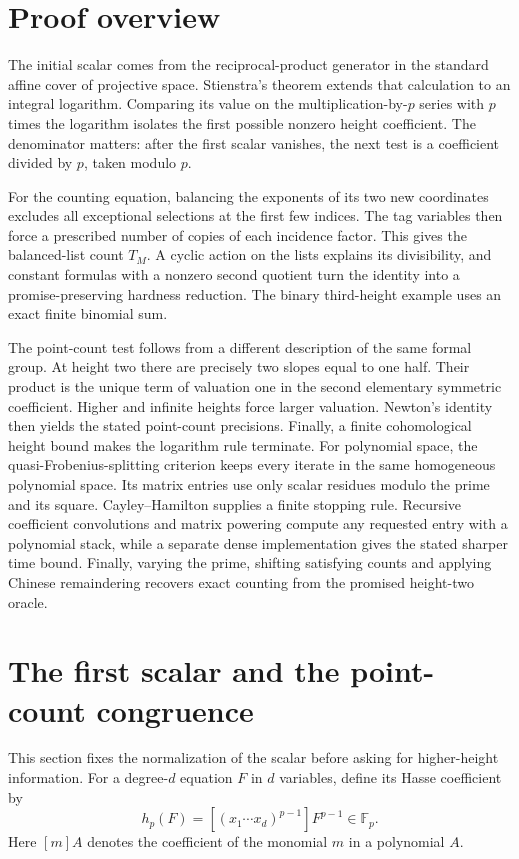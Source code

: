 \documentclass[11pt]{article}
\theoremstyle{definition}
\begin{document}
\section{Proof overview}
The initial scalar comes from the reciprocal-product generator in the
standard affine cover of projective space. Stienstra's theorem extends
that calculation to an integral logarithm. Comparing its value on the
multiplication-by-$p$ series with $p$ times the logarithm isolates the
first possible nonzero height coefficient. The denominator matters:
after the first scalar vanishes, the next test is a coefficient divided
by $p$, taken modulo $p$.

For the counting equation, balancing the exponents of its two new
coordinates excludes all exceptional selections at the first few
indices. The tag variables then force a prescribed number of copies
of each incidence factor. This gives the balanced-list count $T_M$.
A cyclic action on the lists explains its divisibility, and constant
formulas with a nonzero second quotient turn the identity into a
promise-preserving hardness reduction. The binary third-height example
uses an exact finite binomial sum.

The point-count test follows from a different description of the same
formal group. At height two there are precisely two slopes equal to
one half. Their product is the unique term of valuation one in the
second elementary symmetric coefficient. Higher and infinite heights
force larger valuation. Newton's identity then yields the stated
point-count precisions. Finally, a finite cohomological height bound
makes the logarithm rule terminate. For polynomial space, the quasi-Frobenius-splitting criterion
keeps every iterate in the same homogeneous polynomial space. Its
matrix entries use only scalar residues modulo the prime and its square.
Cayley--Hamilton supplies a finite stopping rule. Recursive coefficient
convolutions and matrix powering compute any requested entry with a
polynomial stack, while a separate dense implementation gives the
stated sharper time bound. Finally, varying
the prime, shifting satisfying counts and applying Chinese remaindering
recovers exact counting from the promised height-two oracle.

\section{The first scalar and the point-count congruence}
This section fixes the normalization of the scalar before asking for higher-height information.
For a degree-$d$ equation $F$ in $d$ variables, define its Hasse coefficient by
\[
 h_p(F)=[(x_1\cdots x_d)^{p-1}]F^{p-1}\in\mathbb F_p.
\]
Here $[m]A$ denotes the coefficient of the monomial $m$ in a polynomial $A$.
\end{document}
